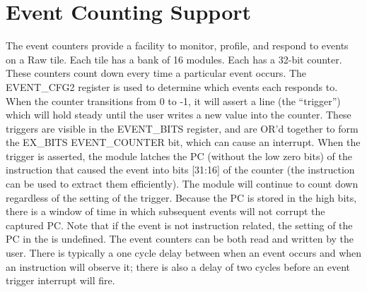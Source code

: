 \section{Event Counting Support}
\label{sec:event-counting}
\standardstretch
The event counters provide a facility to monitor, profile, and respond to events on a Raw tile.
Each tile has a bank of 16  modules. Each 
has a 32-bit counter. These counters count down every time a particular event occurs.
The EVENT\_CFG2 register is used to determine which events each  responds to.
When the counter transitions from 0 to -1, it will assert a line (the ``trigger'') which
will hold steady until the user writes a new value into the counter. These triggers are visible
in the EVENT\_BITS register, and are OR'd together to form the EX\_BITS EVENT\_COUNTER bit,
which can cause an interrupt. When the trigger is asserted, the  module
 latches the PC (without the low zero bits)
of the instruction that caused the event into bits [31:16] of the counter (the 
instruction can be used to extract them efficiently). The  module will continue
to count down regardless of the setting of the trigger. Because the PC is stored in the high bits,
there is a window of time in which subsequent events will not corrupt the captured PC. Note
that if the event is not instruction related, the setting of the PC in the 
is undefined. The event counters can be both read and written by the user. There is typically a one
cycle delay between when an event occurs and when an  instruction will observe it;
there is also a delay of two cycles before an event trigger interrupt will fire.
\vspace{5mm}

